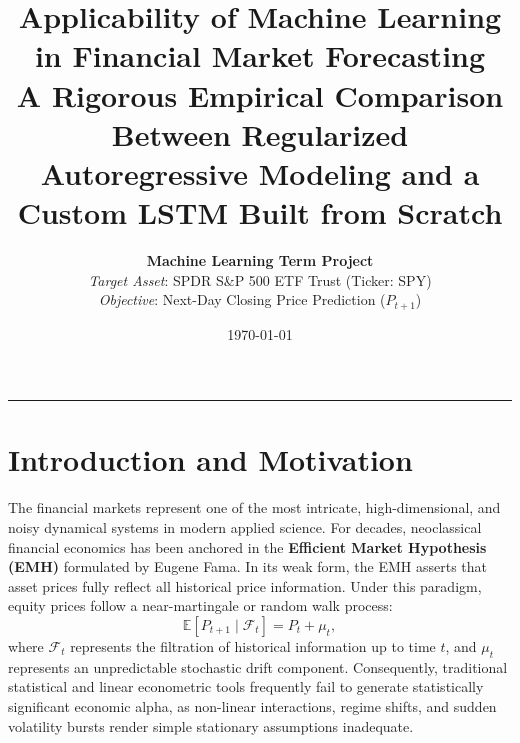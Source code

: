 \documentclass[11pt,letterpaper]{article}
\title{\vspace{-1.5cm}\textbf{\Large Applicability of Machine Learning in Financial Market Forecasting} \\
\large A Rigorous Empirical Comparison Between Regularized Autoregressive Modeling and a Custom LSTM Built from Scratch}
\author{\textbf{Machine Learning Term Project} \\
\textit{Target Asset}: SPDR S\&P 500 ETF Trust (Ticker: SPY) \\
\textit{Objective}: Next-Day Closing Price Prediction ($P_{t+1}$)}
\date{\today}
\begin{document}
\maketitle
\thispagestyle{empty}
\vspace{-0.5cm}
\hrule
\vspace{0.6cm}

\section{Introduction and Motivation}

The financial markets represent one of the most intricate, high-dimensional, and noisy dynamical systems in modern applied science. For decades, neoclassical financial economics has been anchored in the \textbf{Efficient Market Hypothesis (EMH)} formulated by Eugene Fama. In its weak form, the EMH asserts that asset prices fully reflect all historical price information. Under this paradigm, equity prices follow a near-martingale or random walk process:
\begin{equation}
    \mathbb{E}[P_{t+1} \mid \mathcal{F}_t] = P_t + \mu_t,
\end{equation}
where $\mathcal{F}_t$ represents the filtration of historical information up to time $t$, and $\mu_t$ represents an unpredictable stochastic drift component. Consequently, traditional statistical and linear econometric tools frequently fail to generate statistically significant economic alpha, as non-linear interactions, regime shifts, and sudden volatility bursts render simple stationary assumptions inadequate.
\end{document}
